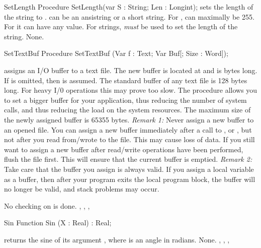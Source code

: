 \documentclass{report}
\begin{document}


\begin{procedure}{SetLength}
\Declaration
Procedure SetLength(var S : String; Len : Longint);
\Description
{} sets the length of the string  to . 
can be an ansistring or a short string. 
For ,  can maximally be 255. For 
it can have any value. For  strings,  {\em
must} be used to set the length of the string.
\Errors
None.
\SeeAlso
{}
\end{procedure}




\begin{procedure}{SetTextBuf}
\Declaration
Procedure SetTextBuf (Var f : Text; Var Buf[; Size : Word]);

\Description
{} assigns an I/O buffer to a text file. The new buffer is
located at  and is  bytes long. If  is omitted,
then  is assumed.
The standard buffer of any text file is 128 bytes long. For heavy I/0
operations this may prove too slow. The  procedure allows
you to set a bigger buffer for your application, thus reducing the number of
system calls, and thus reducing the load on the system resources.
The maximum size of the newly assigned buffer is 65355 bytes.
{\em Remark 1:} Never assign a new buffer to an opened file. You can assign a
new buffer immediately after a call to ,  or
, but not after you read from/wrote to the file. This may cause
loss of data. If you still want to assign a new buffer after read/write
operations have been performed, flush the file first. This will ensure that
the current buffer is emptied.
{\em Remark 2:} Take care that the buffer you assign is always valid. If you
assign a local variable as a buffer, then after your program exits the local
program block, the buffer will no longer be valid, and stack problems may
occur.

\Errors
No checking on  is done.
\SeeAlso
{}, , , 
\end{procedure}


\begin{function}{Sin}
\Declaration
Function Sin (X : Real) : Real;

\Description
{} returns the sine of its argument , where  is an
angle in radians.
\Errors
None.
\SeeAlso
{}, , , 
\end{function}
\end{document}

